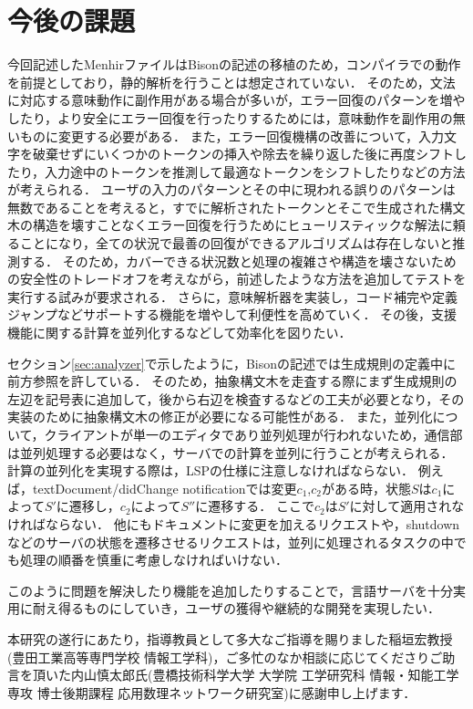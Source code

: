 \documentclass[fontsize=9bp,twocolumn,column_gap=2.36zw,a4paper,report]{jlreq}
\begin{document}
\chapter{今後の課題}

今回記述したMenhirファイルはBisonの記述の移植のため，コンパイラでの動作を前提としており，静的解析を行うことは想定されていない．
そのため，文法に対応する意味動作に副作用がある場合が多いが，エラー回復のパターンを増やしたり，より安全にエラー回復を行ったりするためには，意味動作を副作用の無いものに変更する必要がある．
また，エラー回復機構の改善について，入力文字を破棄せずにいくつかのトークンの挿入や除去を繰り返した後に再度シフトしたり，入力途中のトークンを推測して最適なトークンをシフトしたりなどの方法が考えられる．
ユーザの入力のパターンとその中に現われる誤りのパターンは無数であることを考えると，すでに解析されたトークンとそこで生成された構文木の構造を壊すことなくエラー回復を行うためにヒューリスティックな解法に頼ることになり，全ての状況で最善の回復ができるアルゴリズムは存在しないと推測する．
そのため，カバーできる状況数と処理の複雑さや構造を壊さないための安全性のトレードオフを考えながら，前述したような方法を追加してテストを実行する試みが要求される．
さらに，意味解析器を実装し，コード補完や定義ジャンプなどサポートする機能を増やして利便性を高めていく．
その後，支援機能に関する計算を並列化するなどして効率化を図りたい．\par
セクション\ref{sec:analyzer}で示したように，Bisonの記述では生成規則の定義中に前方参照を許している．
そのため，抽象構文木を走査する際にまず生成規則の左辺を記号表に追加して，後から右辺を検査するなどの工夫が必要となり，その実装のために抽象構文木の修正が必要になる可能性がある．
また，並列化について，クライアントが単一のエディタであり並列処理が行われないため，通信部は並列処理する必要はなく，サーバでの計算を並列に行うことが考えられる．
計算の並列化を実現する際は，LSPの仕様に注意しなければならない．
例えば，textDocument/didChange notificationでは変更\(c_1\),\(c_2\)がある時，状態\(S\)は\(c_1\)によって\(S'\)に遷移し，\(c_2\)によって\(S''\)に遷移する．
ここで\(c_2\)は\(S'\)に対して適用されなければならない．
他にもドキュメントに変更を加えるリクエストや，shutdownなどのサーバの状態を遷移させるリクエストは，並列に処理されるタスクの中でも処理の順番を慎重に考慮しなければいけない．\par
このように問題を解決したり機能を追加したりすることで，言語サーバを十分実用に耐え得るものにしていき，ユーザの獲得や継続的な開発を実現したい．
\newline

\acknowledgement
本研究の遂行にあたり，指導教員として多大なご指導を賜りました稲垣宏教授(豊田工業高等専門学校 情報工学科)，ご多忙のなか相談に応じてくださりご助言を頂いた内山慎太郎氏(豊橋技術科学大学 大学院 工学研究科 情報・知能工学専攻 博士後期課程 応用数理ネットワーク研究室)に感謝申し上げます．
\newline



\end{document}
